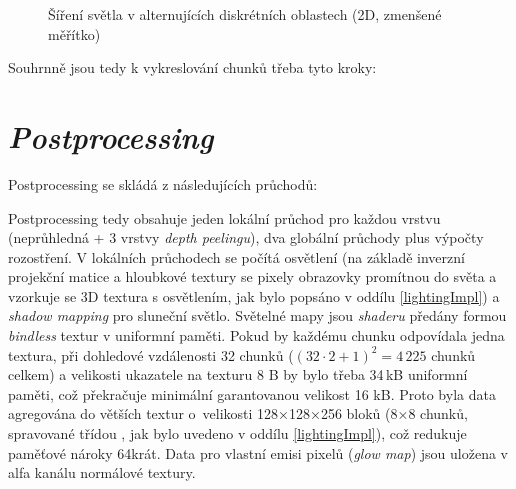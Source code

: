 \begin{figure}[H]
\begin{minipage}[t]{0.3\textwidth}
	\end{minipage}
	\caption{Šíření světla v alternujících diskrétních oblastech (2D, zmenšené měřítko)}
\end{figure}

Souhrnně jsou tedy k vykreslování chunků třeba tyto kroky:

\section{\textit{Postprocessing}}
Postprocessing se skládá z následujících průchodů: \nopagebreak
{}

Postprocessing tedy obsahuje jeden lokální průchod pro každou vrstvu (neprůhledná + 3 vrstvy \textit{depth peelingu}), dva globální průchody plus výpočty rozostření. V lokálních průchodech se počítá osvětlení (na základě inverzní projekční matice a hloubkové textury se pixely obrazovky promítnou do světa a vzorkuje se 3D textura s osvětlením, jak bylo popsáno v oddílu \ref{lightingImpl}) a \textit{shadow mapping} pro sluneční světlo. Světelné mapy jsou \textit{shaderu} předány formou \textit{bindless} textur v uniformní paměti. Pokud by každému chunku odpovídala jedna textura, při dohledové vzdálenosti 32 chunků ($(32 \cdot 2 + 1)^2 = 4\,225$ chunků celkem) a velikosti ukazatele na texturu 8 B by bylo třeba 34\,kB uniformní paměti, což překračuje minimální garantovanou velikost 16 kB. Proto byla data agregována do větších textur o~velikosti 128×128×256 bloků (8×8 chunků, spravované třídou , jak bylo uvedeno v oddílu \ref{lightingImpl}), což redukuje paměťové nároky 64krát. Data pro vlastní emisi pixelů (\textit{glow map}) jsou uložena v alfa kanálu normálové textury.

